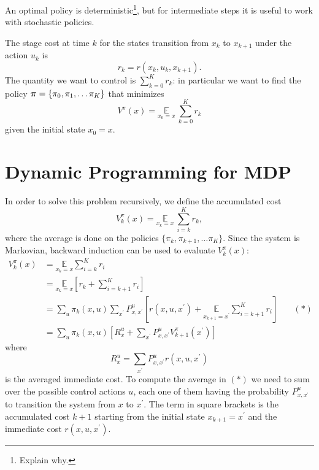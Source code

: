 An optimal policy is deterministic\footnote{Explain why.}, but for intermediate steps it is useful to work with stochastic policies.

The stage cost at time $k$ for the states transition from $x_k$ to $x_{k+1}$ under the action $u_k$ is
\begin{equation*}
  r_k = r(x_k,u_k,x_{k+1}).
\end{equation*}
The quantity we want to control is $\sum_{k=0}^K r_k$: in particular we want to find the policy $\boldsymbol{\pi}=\{\pi_0,\pi_1,\ldots \pi_K\}$ that minimizes
\begin{equation*}
  V^\pi(x) = \underset{x_0=x}{\mathbb{E}}\ \sum_{k=0}^K r_k
\end{equation*}
given the initial state $x_0=x$.

\section{Dynamic Programming for MDP}
\label{sec:MDP-dynamic-programming}

In order to solve this problem recursively, we define the accumulated cost
\begin{equation*}
  V_k^\pi(x) = \underset{x_k=x}{\mathbb{E}}\ \sum_{i=k}^K r_k,
\end{equation*}
where the average is done on the policies $\{\pi_k, \pi_{k+1},\ldots \pi_K\}$. Since the system is Markovian, backward induction can be used to evaluate $V_k^\pi(x)$:
\begin{equation}
  \label{eq:MDP-recursive-value}
  \begin{aligned}
    V_k^\pi(x) &= \underset{x_k=x}{\mathbb{E}}\sum_{i=k}^K r_i \\
               &= \underset{x_k=x}{\mathbb{E}}\left[r_k + \sum_{i=k+1}^K r_i\right] \\
               &= \sum_u \pi_k(x,u)\sum_{x^\prime} P_{x,x^\prime}^u \left[r(x,u,x^\prime) + \underset{x_{k+1}=x^\prime}{\mathbb{E}}\sum_{i=k+1}^K r_i\right] & \quad (*) \\
               &= \sum_u \pi_k(x,u)\left[R^u_x + \sum_{x^\prime}P_{x,x^\prime}^u V^\pi_{k+1}(x^\prime)\right]
  \end{aligned}
\end{equation}
where
\begin{equation*}
  R^u_x = \sum_{x^\prime} P^u_{x,x^\prime}r(x,u,x^\prime)
\end{equation*}
is the averaged immediate cost.
To compute the average in $(*)$ we need to sum over the possible control actions $u$, each one of them having the probability $P_{x,x^\prime}^u$ to transition the system from $x$ to $x^\prime$. The term in square brackets is the accumulated cost $k+1$ starting from the initial state $x_{k+1}=x^\prime$ and the immediate cost $r(x,u,x^\prime)$.

